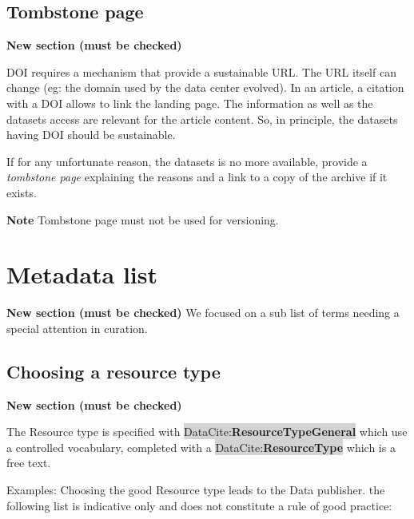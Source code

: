 \documentclass[11pt,a4paper]{ivoa}
\newcommand{\dataciteterm}[1]{\colorbox{lightgray}{DataCite:\textbf{#1}}}
\newcommand{\important}[1]{
	\begin{bigdescription}
		\item \color{ivoacolor}\textbf{Note} #1
	\end{bigdescription}
}
\begin{document}
\subsection{Tombstone page}
\label{sec:tombstone}
\textbf{\color{red}New section (must be checked)}

DOI requires a mechanism that provide a sustainable URL. The URL itself can change (eg: the domain used by the data center evolved).
In an article, a citation with a DOI allows to link the landing page. The information as well as the datasets access are relevant for the article content. So, in principle, the datasets having DOI should be sustainable. 


If for any unfortunate reason, the datasets is no more available, provide a \textit{tombstone page} explaining the reasons and a link to a copy of the archive if it exists.

\important{Tombstone page must not be used for versioning.}


\section{Metadata list}
\textbf{\color{red}New section (must be checked)}
We focused on a sub list of terms needing a special attention in curation.

\subsection{Choosing a resource type}\label{sec:resourcetype}
\textbf{\color{red}New section (must be checked)}

The Resource type is specified with  \dataciteterm{ResourceTypeGeneral} which use a controlled vocabulary, completed with a \dataciteterm{ResourceType} which is a free text.

Examples: Choosing the good Resource type leads to the Data publisher.
the following list is indicative only and does not constitute a rule of good practice:
\end{document}
